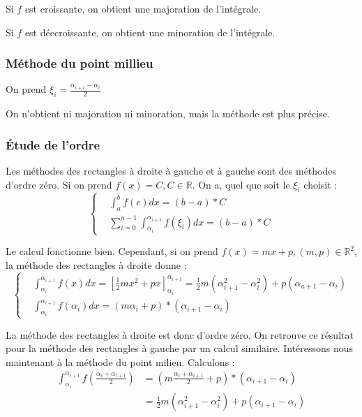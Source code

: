 \documentclass{article}
\begin{document}
Si $f$ est croissante, on obtient une majoration de l'intégrale.

Si $f$ est déccroissante, on obtient une minoration de l'intégrale.

\subsubsection{Méthode du point millieu}
On prend $\xi_i = \frac{\alpha_{i+1} - \alpha_i}{2}$

On n'obtient ni majoration ni minoration, mais la méthode est plus précise.

\subsubsection{Étude de l'ordre}
Les méthodes des rectangles à droite à gauche et à gauche sont des méthodes d'ordre zéro. Si on prend $f(x) = C, C\in\mathbb{R}$. On a, quel que soit le $\xi_i$ choisit :
\[
    \left\{\begin{aligned} &\int_a^b f(c)dx = (b-a)*C \\
                           &\sum_{i=0}^{n-1} \int_{\alpha_i}^{\alpha_{i+1}} f(\xi_i)dx = (b-a)*C
    \end{aligned}\right.
\]

Le calcul fonctionne bien. Cependant, si on prend $f(x) = mx+p, (m,p)\in\mathbb{R}^2$, la méthode des rectangles à droite donne :
\[
    \left\{\begin{aligned}
            & \int_{\alpha_i}^{\alpha_{i+1}} f(x)dx = \left[\frac{1}{2}mx^2+px\right]_{\alpha_i}^{\alpha_{i+1}} = \frac{1}{2}m(\alpha_{i+1}^2 - \alpha_i^2) + p(\alpha_{a+1} - \alpha_i) \\
            & \int_{\alpha_i}^{\alpha_{i+1}} f(\alpha_i)dx = (m\alpha_i + p) * (\alpha_{i+1} - \alpha_i)
    \end{aligned}\right.
\]

La méthode des rectangles à droite est donc d'ordre zéro. On retrouve ce résultat pour la méthode des rectangles à gauche par un calcul similaire. Intéressons nous maintenant à la méthode du point milieu. Calculons :
\[
    \begin{aligned} \int_{\alpha_i}^{\alpha_{i+1}} f\left(\frac{\alpha_i + \alpha_{i+1}}{2}\right) & = \left(m\frac{\alpha_i + \alpha_{i+1}}{2} + p\right) * (\alpha_{i+1} - \alpha_i) \\
                                                                                                   & = \frac{1}{2}m(\alpha_{i+1}^2 - \alpha_i^2) + p(\alpha_{i+1} - \alpha_i)
    \end{aligned}
\]
\end{document}
